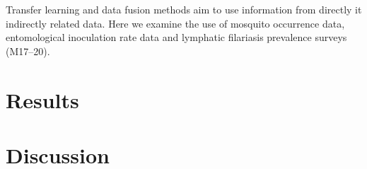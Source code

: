 \documentclass{bmcart}
\begin{document}

Transfer learning and data fusion methods aim to use information from directly it indirectly related data.
Here we examine the use of mosquito occurrence data, entomological inoculation rate data and lymphatic filariasis prevalence surveys (M17--20).



\section*{Results}

\section*{Discussion}






\end{document}
